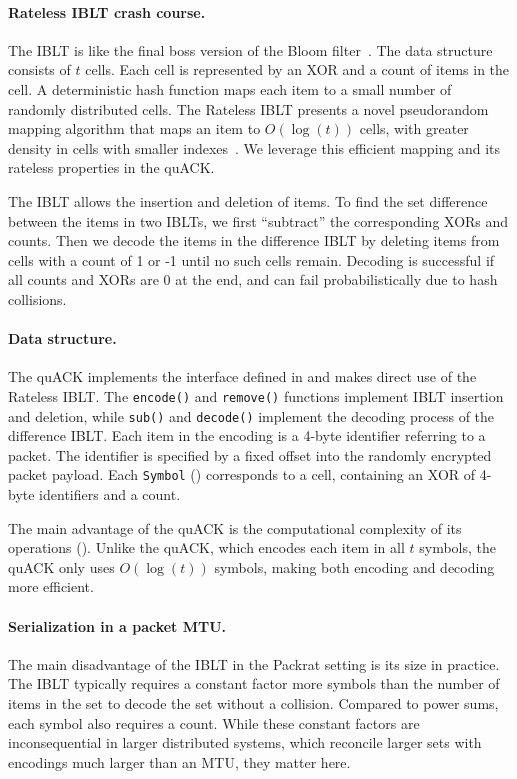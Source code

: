 \paragraph{Rateless IBLT crash course.} The IBLT is like the final boss version
 of the Bloom filter~\cite{goodrich2011invertible}. The data structure consists of $t$ cells. Each
 cell is represented by an XOR and a count of items in the cell. A
 deterministic hash function maps each item to a small number of randomly
 distributed cells. The Rateless IBLT presents a novel pseudorandom mapping
 algorithm that maps an item to $O(\log(t))$ cells, with greater density in
 cells with smaller indexes~\cite{yang2024practical}. We leverage this
 efficient mapping and its rateless properties in the quACK.

The IBLT allows the insertion and deletion of items. To find the set difference
between the items in two IBLTs, we first ``subtract'' the corresponding XORs
and counts. Then we decode the items in the difference IBLT by deleting items
from cells with a count of 1 or -1 until no such cells remain. Decoding is
successful if all counts and XORs are 0 at the end, and can fail
probabilistically due to hash collisions.

\paragraph{Data structure.}

The quACK implements
the interface defined in  and makes direct use of the Rateless IBLT.
The \texttt{encode()} and \texttt{remove()} functions implement IBLT insertion
and deletion, while \texttt{sub()} and \texttt{decode()} implement
the decoding process of the difference IBLT.
Each item in the encoding is a 4-byte identifier referring to a packet. The
identifier is specified by a fixed offset into the randomly encrypted packet
payload. Each \texttt{Symbol} () corresponds to a
cell, containing an XOR of 4-byte identifiers and a count.

The main advantage of the quACK is the computational complexity of its
operations (). Unlike the quACK,
which encodes each item in all $t$ symbols, the quACK only uses
$O(\log(t))$ symbols, making both encoding and decoding more efficient.



\paragraph{Serialization in a packet MTU.} The main disadvantage of the IBLT in
 the Packrat setting is its size in practice. The IBLT typically requires a constant factor
 more symbols than the number of items in the set to decode the set without a
 collision. Compared to power sums, each symbol also requires a count. While
 these constant factors are inconsequential in larger distributed systems,
 which reconcile larger sets with encodings much larger than an MTU, they
 matter here.


